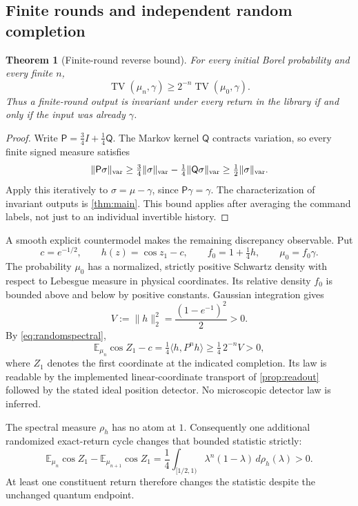 \documentclass[11pt]{article}
\numberwithin{equation}{section}
\newtheorem{theorem}{Theorem}[section]
\theoremstyle{definition}
\begin{document}
\subsection{Finite rounds and independent random completion}
\begin{theorem}[Finite-round reverse bound]\label{thm:finiteobstruction}
For every initial Borel probability and every finite $n$,
\begin{equation}\label{eq:reverseTV}
 \operatorname{TV}(\mu_n,\gamma)
 \ge2^{-n}\operatorname{TV}(\mu_0,\gamma).
\end{equation}
Thus a finite-round output is invariant under every return in the library if and only if the input was already $\gamma$.
\end{theorem}
\begin{proof}
Write $\mathsf P=\tfrac34I+\tfrac14\mathsf Q$. The Markov kernel $\mathsf Q$ contracts variation, so every finite signed measure satisfies
\[
 \|\mathsf P\sigma\|_{\rm var}
 \ge\tfrac34\|\sigma\|_{\rm var}-\tfrac14\|\mathsf Q\sigma\|_{\rm var}
 \ge\tfrac12\|\sigma\|_{\rm var}.
\]
Apply this iteratively to $\sigma=\mu-\gamma$, since $\mathsf P\gamma=\gamma$. The characterization of invariant outputs is \cref{thm:main}. This bound applies after averaging the command labels, not just to an individual invertible history.
\end{proof}

A smooth explicit countermodel makes the remaining discrepancy observable. Put
\[
 c=e^{-1/2},\qquad h(z)=\cos z_1-c,\qquad
 f_0=1+\tfrac14h,\qquad \mu_0=f_0\gamma.
\]
The probability $\mu_0$ has a normalized, strictly positive Schwartz density with respect to Lebesgue measure in physical coordinates. Its relative density $f_0$ is bounded above and below by positive constants. Gaussian integration gives
\[
 V:=\|h\|_2^2=\frac{(1-e^{-1})^2}{2}>0.
\]
By \eqref{eq:randomspectral},
\begin{equation}\label{eq:cosbias}
 \mathbb E_{\mu_n}\cos Z_1-c
 =\tfrac14\langle h,P^nh\rangle
 \ge\tfrac14\,2^{-n}V>0,
\end{equation}
where $Z_1$ denotes the first coordinate at the indicated completion. Its law is readable by the implemented linear-coordinate transport of \cref{prop:readout} followed by the stated ideal position detector. No microscopic detector law is inferred.

The spectral measure $\rho_h$ has no atom at $1$. Consequently one additional randomized exact-return cycle changes that bounded statistic strictly:
\[
 \mathbb E_{\mu_n}\cos Z_1-\mathbb E_{\mu_{n+1}}\cos Z_1
 =\frac14\int_{[1/2,1)}\lambda^n(1-\lambda)\,d\rho_h(\lambda)>0.
\]
At least one constituent return therefore changes the statistic despite the unchanged quantum endpoint.
\end{document}

